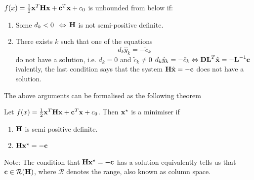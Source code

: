 \documentclass[a4paper]{article}
\numberwithin{equation}{section} %
\newcounter{solution}
\newcommand{\hquad}{\hskip0.5em\relax}%
\newcommand{\B}[1]{\textbf{\textup{#1}}} %
\begin{document}
\begin{lemma}
$f(x)=\frac{1}{2}\B{x}^T\B{H}\B{x}+\B{c}^T\B{x}+c_0$ is unbounded from below if:
\begin{enumerate}
\item  Some $d_k < 0 \hquad \Leftrightarrow$ $\B{H}$ is not semi-positive definite.
\item There exists $k$ such that one of the equations 
\[
d_k \hat{y}_k=-\tilde{c}_k
\]
do not have a solution, i.e. $d_k=0$ and $\tilde{c}_k \neq 0$
$d_k \hat{y}_k=-\tilde{c}_k\Leftrightarrow \B{DL}^T\hat{\B{x}}=-\B{L}^{-1}\B{c}$
ivalently, the last condition says that the system $\B{H}\hat{\B{x}}=-\B{c}$ does not have a solution.
\end{enumerate}
\end{lemma}

The above arguments can be formalised as the following theorem

\begin{shaded*}
\begin{theorem}
Let $f(x)=\frac{1}{2}\B{x}^T\B{H}\B{x}+\B{c}^T\B{x}+c_0$. Then $\B{x}^{\star}$ is a minimiser if
\begin{enumerate}
\item $\B{H}$ is semi positive definite.
\item $\B{H}{\B{x}^{\star}}=-\B{c}$
\end{enumerate}
\end{theorem}
\end{shaded*}
Note: The condition that $\B{H}{\B{x}^{\star}}=-\B{c}$ has a solution equivalently tells us that $\B{c} \in \mathcal{R}(\B{H})$, where $\mathcal{R}$ denotes the range, also known as column space.
\end{document}
